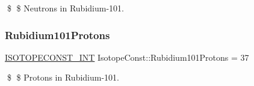 \$ \$ Neutrons in Rubidium-\/101. \mbox{\label{group___isotope_const-_rubidium-_rb101_gaeabe86ba44c1b6ce3cb4cd6eb48e0afe}} 
\subsubsection{\texorpdfstring{Rubidium101\+Protons}{Rubidium101Protons}}
{\footnotesize\ttfamily \mbox{\hyperlink{group___isotope_const-_macros_ga5f18360b3e99483a35c32d789e62621c}{I\+S\+O\+T\+O\+P\+E\+C\+O\+N\+S\+T\+\_\+\+I\+NT}} Isotope\+Const\+::\+Rubidium101\+Protons = 37}

\$ \$ Protons in Rubidium-\/101. 